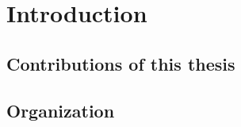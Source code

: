\chapter{Introduction}
\label{ch:intro}

\section{Contributions of this thesis}
\label{sec:contributions}

\section{Organization}
\label{sec:organization}

